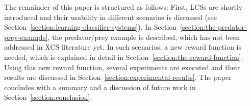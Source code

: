 The remainder of this paper is structured as follows: First, LCSs are shortly introduced and their usability in different scenarios is discussed (see Section~\ref{section:learning-classifier-systems}). In Section~\ref{section:the-predator-prey-example}, the predator/prey example is described, which has not been addressed in XCS literature yet. %
In such scenarios, a new reward function is needed, which is explained in detail in Section~\ref{section:the-reward-function}. Using this new reward function, several experiments are executed and their results are discussed in Section~\ref{section:experimental-results}. The paper concludes with a summary and a discussion of future work in Section~\ref{section:conclusion}. %
